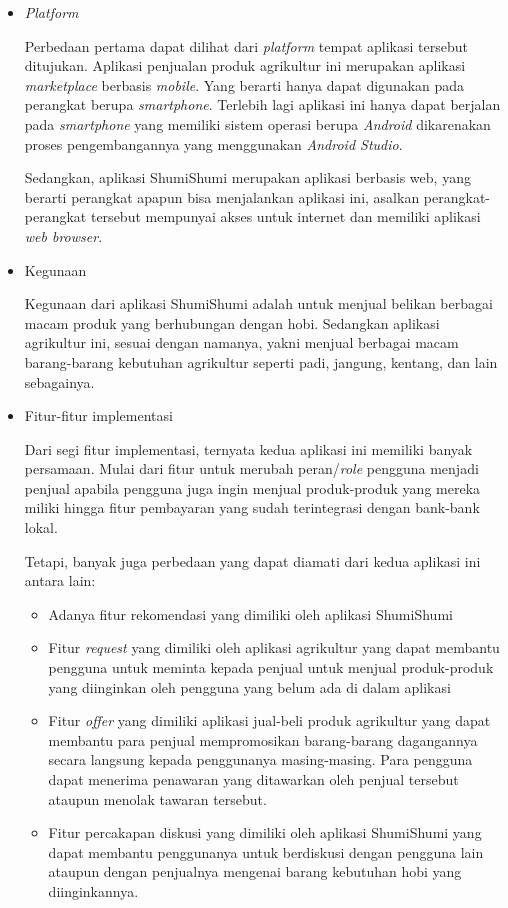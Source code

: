 \documentclass[a4paper]{article}
\begin{document}
\begin{enumerate}
    \begin{itemize}
        \item \textit{Platform}
        
        Perbedaan pertama dapat dilihat dari \textit{platform} tempat aplikasi tersebut ditujukan. Aplikasi penjualan produk agrikultur ini merupakan aplikasi \textit{marketplace} berbasis \textit{mobile}. Yang berarti hanya dapat digunakan pada perangkat berupa \textit{smartphone}. Terlebih lagi aplikasi ini hanya dapat berjalan pada \textit{smartphone} yang memiliki sistem operasi berupa \textit{Android} dikarenakan proses pengembangannya yang menggunakan \textit{Android Studio}. 
        
        Sedangkan, aplikasi ShumiShumi merupakan aplikasi berbasis web, yang berarti perangkat apapun bisa menjalankan aplikasi ini, asalkan perangkat-perangkat tersebut mempunyai akses untuk internet dan memiliki aplikasi \textit{web browser}. 

        \item Kegunaan
        
        Kegunaan dari aplikasi ShumiShumi adalah untuk menjual belikan berbagai macam produk yang berhubungan dengan hobi. Sedangkan aplikasi agrikultur ini, sesuai dengan namanya, yakni menjual berbagai macam barang-barang kebutuhan agrikultur seperti padi, jangung, kentang, dan lain sebagainya. 

        \item Fitur-fitur implementasi
        
        Dari segi fitur implementasi, ternyata kedua aplikasi ini memiliki banyak persamaan. Mulai dari fitur untuk merubah peran/\textit{role} pengguna menjadi penjual apabila pengguna juga ingin menjual produk-produk yang mereka miliki hingga fitur pembayaran yang sudah terintegrasi dengan bank-bank lokal. 

        Tetapi, banyak juga perbedaan yang dapat diamati dari kedua aplikasi ini antara lain: 
        
        \begin{itemize}
            \item Adanya fitur rekomendasi yang dimiliki oleh aplikasi ShumiShumi
            \item Fitur \textit{request} yang dimiliki oleh aplikasi agrikultur yang dapat membantu pengguna untuk meminta kepada penjual untuk menjual produk-produk yang diinginkan oleh pengguna yang belum ada di dalam aplikasi
            \item Fitur \textit{offer} yang dimiliki aplikasi jual-beli produk agrikultur yang dapat membantu para penjual mempromosikan barang-barang dagangannya secara langsung kepada penggunanya masing-masing. Para pengguna dapat menerima penawaran yang ditawarkan oleh penjual tersebut ataupun menolak tawaran tersebut. 
            \item Fitur percakapan diskusi yang dimiliki oleh aplikasi ShumiShumi yang dapat membantu penggunanya untuk berdiskusi dengan pengguna lain ataupun dengan penjualnya mengenai barang kebutuhan hobi yang diinginkannya. 
        \end{itemize}
    \end{itemize}


\end{enumerate}
\end{document}

